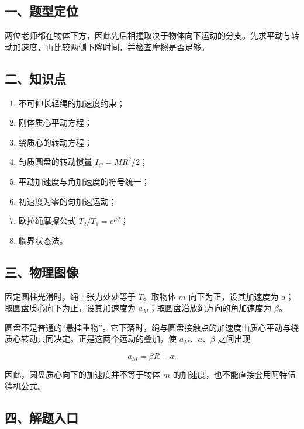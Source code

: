 \documentclass[12pt,a4paper,UTF8]{ctexart}
\newcommand{\tightlist}{\setlength{\itemsep}{0pt}\setlength{\parskip}{0pt}}
\begin{document}
\subsection{一、题型定位}\label{ux4e00ux9898ux578bux5b9aux4f4d-3}

两位老师都在物体下方，因此先后相撞取决于物体向下运动的分支。先求平动与转动加速度，再比较两侧下降时间，并检查摩擦是否足够。

\subsection{二、知识点}\label{ux4e8cux77e5ux8bc6ux70b9-3}

\begin{enumerate}
\def\labelenumi{\arabic{enumi}.}
\tightlist
\item
  不可伸长轻绳的加速度约束；
\item
  刚体质心平动方程；
\item
  绕质心的转动方程；
\item
  匀质圆盘的转动惯量 \(I_C=MR^2/2\)；
\item
  平动加速度与角加速度的符号统一；
\item
  初速度为零的匀加速运动；
\item
  欧拉绳摩擦公式 \(T_2/T_1=e^{\mu\theta}\)；
\item
  临界状态法。
\end{enumerate}

\subsection{三、物理图像}\label{ux4e09ux7269ux7406ux56feux50cf-3}

固定圆柱光滑时，绳上张力处处等于 \(T\)。取物体 \(m\)
向下为正，设其加速度为 \(a\)；取圆盘质心向下为正，设其加速度为
\(a_M\)；取圆盘沿放绳方向的角加速度为 \(\beta\)。

圆盘不是普通的``悬挂重物''。它下落时，绳与圆盘接触点的加速度由质心平动与绕质心转动共同决定。正是这两个运动的叠加，使
\(a_M\)、\(a\)、\(\beta\) 之间出现

\[
a_M=\beta R-a.
\]

因此，圆盘质心向下的加速度并不等于物体 \(m\)
的加速度，也不能直接套用阿特伍德机公式。

\subsection{四、解题入口}\label{ux56dbux89e3ux9898ux5165ux53e3-3}
\end{document}
